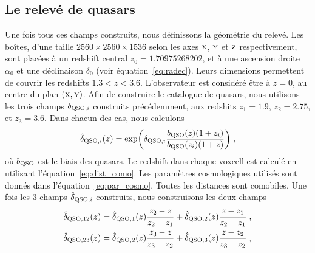 \documentclass[11pt, twoside, a4paper, openright]{report}
\begin{document}
\subsection{Le relevé de quasars}
\label{subsec:qso}
Une fois tous ces champs construits, nous définissons la géométrie du relevé. Les boîtes, d'une taille $\num{2560}\times\num{2560}\times\num{1536}$ selon les axes $\textsc{x}$, $\textsc{y}$ et $\textsc{z}$ respectivement, sont placées à un redshift central $z_0 = 1.70975268202$, et à une ascension droite $\alpha_0$ et une déclinaison $\delta_0$ (voir équation~\ref{eq:radec}). Leurs dimensions permettent de couvrir les redshifts $1.3 < z < 3.6$. L'observateur est considéré être à $z=0$, au centre du plan $(\textsc{x},\textsc{y})$.
Afin de construire le catalogue de quasars, nous utilisons les trois champs $\delta_{\textsc{QSO}, i}$ construits précédemment, aux redshits $z_1 = \num{1.9}$, $z_2 = \num{2.75}$, et $z_3 = \num{3.6}$. Dans chacun des cas, nous calculons
\begin{equation}
  \hat \delta_{\textsc{QSO}, i}(z) = \exp(\delta_{\textsc{QSO},i} \frac{b_{\textsc{QSO}}(z) (1+z_i)}{b_{\textsc{QSO}}(z_i)(1+z)}) \; ,
\end{equation}
où $b_{\textsc{QSO}}$ est le biais des quasars. Le redshift dans chaque voxcell est calculé en utilisant l'équation~\ref{eq:dist_como}. Les paramètres cosmologiques utilisés sont donnés dans l'équation~\ref{eq:par_cosmo}. Toutes les distances sont comobiles.
Une fois les 3 champs $\hat \delta_{\textsc{QSO}, i}$ construits, nous construisons les deux champs
\begin{align}
  \hat \delta_{\textsc{QSO}, 12}(z) &= \hat \delta_{\textsc{QSO}, 1}(z) \frac{z_2 - z}{z_2 - z_1} + \hat \delta_{\textsc{QSO}, 2}(z) \frac{z - z_1}{z_2 - z_1} \; ,\\
  \hat \delta_{\textsc{QSO}, 23}(z) &= \hat \delta_{\textsc{QSO}, 2}(z) \frac{z_3 - z}{z_3 - z_2} + \hat \delta_{\textsc{QSO}, 3}(z) \frac{z - z_2}{z_3 - z_2} \; ,
\end{align}
\end{document}
